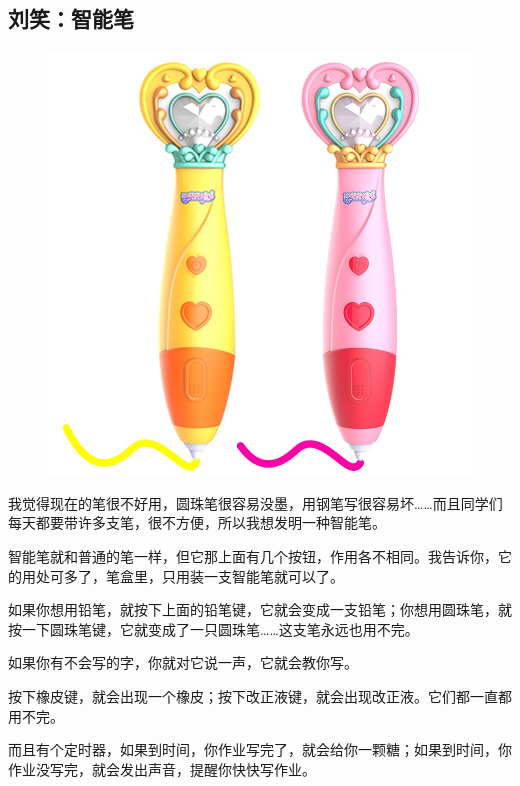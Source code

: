 \vspace{10pt}

{\centering\subsection*{刘笑：智能笔}}


\renewcommand{\leftmark}{刘笑：智能笔}

\begin{figure}[htbp]

\centering

\includegraphics[width = .5\textwidth]{./ch/33.jpg}

\end{figure}



我觉得现在的笔很不好用，圆珠笔很容易没墨，用钢笔写很容易坏……而且同学们每天都要带许多支笔，很不方便，所以我想发明一种智能笔。



智能笔就和普通的笔一样，但它那上面有几个按钮，作用各不相同。我告诉你，它的用处可多了，笔盒里，只用装一支智能笔就可以了。



如果你想用铅笔，就按下上面的铅笔键，它就会变成一支铅笔；你想用圆珠笔，就按一下圆珠笔键，它就变成了一只圆珠笔……这支笔永远也用不完。



如果你有不会写的字，你就对它说一声，它就会教你写。



按下橡皮键，就会出现一个橡皮；按下改正液键，就会出现改正液。它们都一直都用不完。



而且有个定时器，如果到时间，你作业写完了，就会给你一颗糖；如果到时间，你作业没写完，就会发出声音，提醒你快快写作业。



